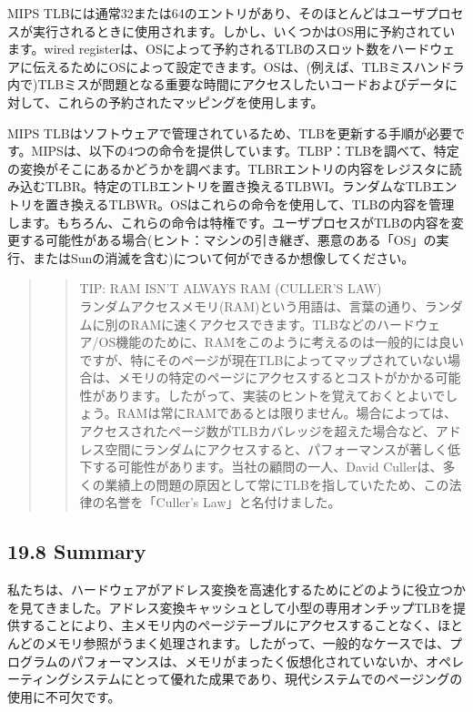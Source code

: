 MIPS
TLBには通常32または64のエントリがあり、そのほとんどはユーザプロセスが実行されるときに使用されます。しかし、いくつかはOS用に予約されています。wired
registerは、OSによって予約されるTLBのスロット数をハードウェアに伝えるためにOSによって設定できます。OSは、(例えば、TLBミスハンドラ内で)TLBミスが問題となる重要な時間にアクセスしたいコードおよびデータに対して、これらの予約されたマッピングを使用します。

MIPS
TLBはソフトウェアで管理されているため、TLBを更新する手順が必要です。MIPSは、以下の4つの命令を提供しています。TLBP：TLBを調べて、特定の変換がそこにあるかどうかを調べます。TLBRエントリの内容をレジスタに読み込むTLBR。特定のTLBエントリを置き換えるTLBWI。ランダムなTLBエントリを置き換えるTLBWR。OSはこれらの命令を使用して、TLBの内容を管理します。もちろん、これらの命令は特権です。ユーザプロセスがTLBの内容を変更する可能性がある場合(ヒント：マシンの引き継ぎ、悪意のある「OS」の実行、またはSunの消滅を含む)について何ができるか想像してください。

\begin{quote}
\begin{quote}
TIP: RAM ISN'T ALWAYS RAM (CULLER'S LAW)\\
ランダムアクセスメモリ(RAM)という用語は、言葉の通り、ランダムに別のRAMに速くアクセスできます。TLBなどのハードウェア/OS機能のために、RAMをこのように考えるのは一般的には良いですが、特にそのページが現在TLBによってマップされていない場合は、メモリの特定のページにアクセスするとコストがかかる可能性があります。したがって、実装のヒントを覚えておくとよいでしょう。RAMは常にRAMであるとは限りません。場合によっては、アクセスされたページ数がTLBカバレッジを超えた場合など、アドレス空間にランダムにアクセスすると、パフォーマンスが著しく低下する可能性があります。当社の顧問の一人、David
Cullerは、多くの業績上の問題の原因として常にTLBを指していたため、この法律の名誉を「Culler's
Law」と名付けました。
\end{quote}
\end{quote}

\hypertarget{summary-12}{%
\subsection*{19.8 Summary}\label{summary-12}}

私たちは、ハードウェアがアドレス変換を高速化するためにどのように役立つかを見てきました。アドレス変換キャッシュとして小型の専用オンチップTLBを提供することにより、主メモリ内のページテーブルにアクセスすることなく、ほとんどのメモリ参照がうまく処理されます。したがって、一般的なケースでは、プログラムのパフォーマンスは、メモリがまったく仮想化されていないか、オペレーティングシステムにとって優れた成果であり、現代システムでのページングの使用に不可欠です。

